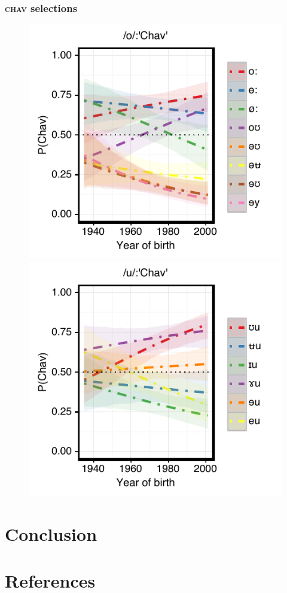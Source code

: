 \documentclass[PWPL]{article}
\begin{document}
\subsubsection{\textsc{chav} selections}
\begin{figure}[ht]
\centering
\includegraphics[scale=0.8]{ow_chav_age.pdf}
\includegraphics[scale=0.8]{uw_chav_age.pdf}
\end{figure}
\section{Conclusion}
\section{References}

\nocite{*}

\end{document}

